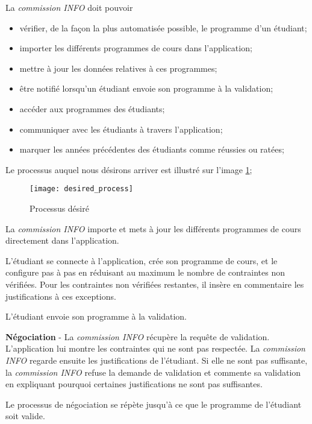 La \textit{commission INFO} doit pouvoir
\begin{itemize}
\item vérifier, de la façon la plus automatisée possible, le programme d'un étudiant;
\item importer les différents programmes de cours dans l'application;
\item mettre à jour les données relatives à ces programmes;
\item être notifié lorsqu'un étudiant envoie son programme à la validation;
\item accéder aux programmes des étudiants;
\item communiquer avec les étudiants à travers l'application;
\item marquer les années précédentes des étudiants comme réussies ou ratées;
\end{itemize}

Le processus auquel nous désirons arriver est illustré sur l'image \ref{fig:desired_process};

\begin{figure}[H]
\centering
\caption{Processus désiré}
\label{fig:desired_process}
\texttt{[image: desired\_process]}
\end{figure}

La \textit{commission INFO} importe et mets à jour les différents programmes de cours directement dans l'application. 

L'étudiant se connecte à l'application, crée son programme de cours, et le configure pas à pas en réduisant au maximum le nombre de contraintes non vérifiées. Pour les contraintes non vérifiées restantes, il insère en commentaire les justifications à ces exceptions. 

L'étudiant envoie son programme à la validation. 

\textbf{Négociation} - La \textit{commission INFO} récupère la requête de validation. L'application lui montre les contraintes qui ne sont pas respectée. La \textit{commission INFO} regarde ensuite les justifications de l'étudiant. Si elle ne sont pas suffisante, la \textit{commission INFO} refuse la demande de validation et commente sa validation en expliquant pourquoi certaines justifications ne sont pas suffisantes. 

Le processus de négociation se répète jusqu'à ce que le programme de l'étudiant soit valide.





